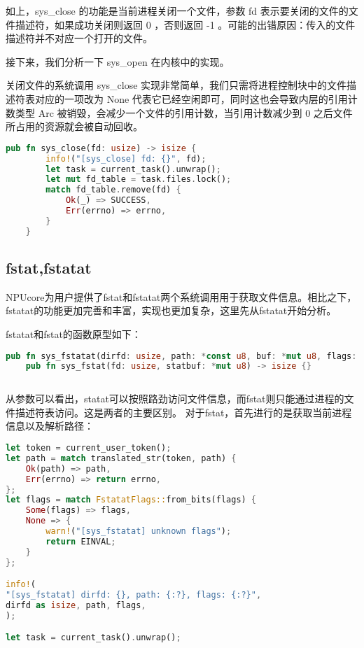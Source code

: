 如上，sys_close 的功能是当前进程关闭一个文件，参数 fd 表示要关闭的文件的文件描述符，如果成功关闭则返回 0 ，否则返回 -1 。可能的出错原因：传入的文件描述符并不对应一个打开的文件。

接下来，我们分析一下 sys_open 在内核中的实现。

关闭文件的系统调用 sys_close 实现非常简单，我们只需将进程控制块中的文件描述符表对应的一项改为 None 代表它已经空闲即可，同时这也会导致内层的引用计数类型 Arc 被销毁，会减少一个文件的引用计数，当引用计数减少到 0 之后文件所占用的资源就会被自动回收。
\begin{lstlisting}[language=rust]
	pub fn sys_close(fd: usize) -> isize {
		info!("[sys_close] fd: {}", fd);
		let task = current_task().unwrap();
		let mut fd_table = task.files.lock();
		match fd_table.remove(fd) {
			Ok(_) => SUCCESS,
			Err(errno) => errno,
		}
	}
\end{lstlisting}

\subsection{fstat,fstatat}
NPUcore为用户提供了fstat和fstatat两个系统调用用于获取文件信息。相比之下，fstatat的功能更加完善和丰富，实现也更加复杂，这里先从fstatat开始分析。

fstatat和fstat的函数原型如下：

\begin{lstlisting}[language={Rust}, label={code:fstat,fstatat},
	caption={fstat,fstatat}]
	pub fn sys_fstatat(dirfd: usize, path: *const u8, buf: *mut u8, flags: u32) -> isize {}
	pub fn sys_fstat(fd: usize, statbuf: *mut u8) -> isize {}
		
\end{lstlisting}

从参数可以看出，statat可以按照路劲访问文件信息，而fstat则只能通过进程的文件描述符表访问。这是两者的主要区别。
对于fstat，首先进行的是获取当前进程信息以及解析路径：

\begin{lstlisting}[language={Rust}, label={code:fstatat_part1},
	caption={fstatat_part1}]
    let token = current_user_token();
let path = match translated_str(token, path) {
	Ok(path) => path,
	Err(errno) => return errno,
};
let flags = match FstatatFlags::from_bits(flags) {
	Some(flags) => flags,
	None => {
		warn!("[sys_fstatat] unknown flags");
		return EINVAL;
	}
};

info!(
"[sys_fstatat] dirfd: {}, path: {:?}, flags: {:?}",
dirfd as isize, path, flags,
);

let task = current_task().unwrap();
	
\end{lstlisting}

